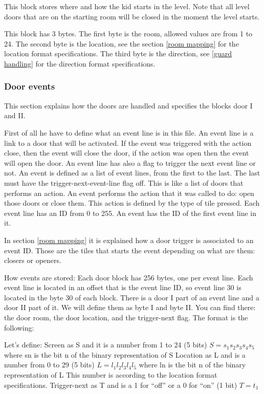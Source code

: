\documentclass{article}
\begin{document}
 This block stores where and how the kid starts in the level. Note that all
 level doors that are on the starting room will be closed in the moment
 the level starts.

 This block has 3 bytes.
 The first byte is the  room, allowed values are from 1 to 24.
 The second byte is the  location, see the section \ref{room mapping} for the location
 format specifications.
 The third byte is the  direction, see \ref{guard handling} for the direction format
 specifications.

\subsubsection{Door events\label{door events}} %
 This section explains how the doors are handled and specifies the blocks
 door I and II.

 First of all he have to define what an event line is in this file. An
 event line is a link to a door that will be activated. If the event was
 triggered with the action close, then the event will close the door, if
 the action was open then the event will open the door. An event line has
 also a flag to  trigger the next event line or not.
 An event is defined as a list of event lines, from the first to the last.
 The last must have the trigger-next-event-line flag off. This is like a
 list of doors that performs an action.
 An event performs the action that it was called to do: open those doors or
 close them. This action is defined by the type of tile pressed.
 Each event line has an ID from 0 to 255. An event has the ID of the first
 event line in it.

 In section \ref{room mapping} it is explained how a door trigger is associated to an
 event ID. Those are the tiles that starts the event depending on what are
 them: closers or openers.

 How events are stored:
 Each door block has 256 bytes, one per event line. Each event line is
 located in an offset that is the event line ID, so event line 30 is
 located in the byte 30 of each block.
 There is a door I part of an event line and a door II part of it. We will
 define them as byte I and byte II.
 You can find there: the door room, the door location, and the
 trigger-next flag. The format is the following:

 Let's define:
  Screen as S and it is a number from 1 to 24 (5 bits)
   $S = s_1 s_2 s_3 s_4 s_5$
    where sn is the bit n of the binary representation of S
  Location as L and is a number from 0 to 29 (5 bits)
   $L = l_1 l_2 l_3 l_4 l_5$
    where ln is the bit n of the binary representation of L
   This number is according to the location format specifications.
  Trigger-next as T and is a 1 for ``off'' or a 0 for ``on'' (1 bit)
   $T = t_1$
\end{document}
